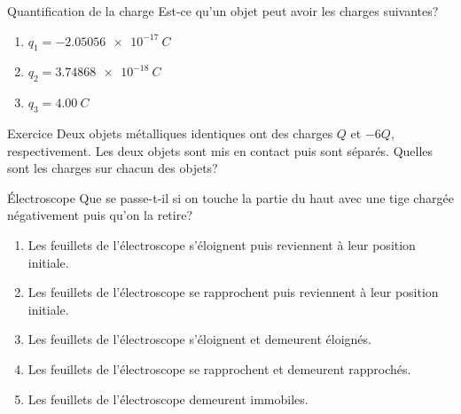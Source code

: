\documentclass{beamer}
\begin{document}
\begin{frame}{Quantification de la charge}
  Est-ce qu'un objet peut avoir les charges suivantes?
  \begin{enumerate}
    \item $q_1 = \SI{-2.05056e-17}{C}$ 
    \item $q_2 = \SI{3.74868e-18}{C}$ 
    \item $q_3 = \SI{4.00}{C}$ 
  \end{enumerate}
\end{frame}

\begin{frame}[t]{Exercice}
  Deux objets métalliques identiques ont des charges $Q$ et $-6Q$,
  respectivement. Les deux objets sont mis en contact puis sont séparés.
  Quelles sont les charges sur chacun des objets?

\end{frame}

\begin{frame}{Électroscope}
  Que se passe-t-il si on touche la partie du haut avec une
  tige chargée négativement puis qu'on la retire?

  \begin{enumerate}
    \item Les feuillets de l'électroscope s'éloignent puis reviennent à leur
      position initiale.
    \item Les feuillets de l'électroscope se rapprochent puis reviennent à leur
      position initiale.
    \item<alert@2> Les feuillets de l'électroscope s'éloignent et demeurent éloignés.
    \item Les feuillets de l'électroscope se rapprochent et demeurent
      rapprochés.
    \item Les feuillets de l'électroscope demeurent immobiles.
  \end{enumerate}
\end{frame}
\end{document}
